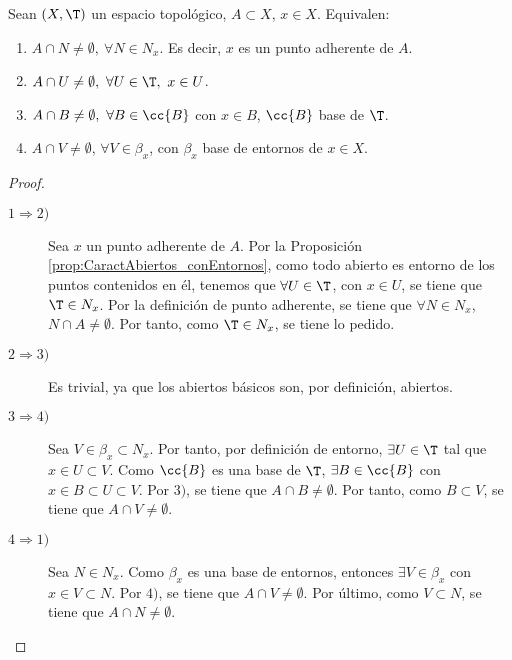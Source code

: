 \begin{prop}\label{prop:Caract_PtoAdherente}
    Sean $(X,\T)$ un espacio topológico, $A\subset X$, $x\in X$. Equivalen:
    \begin{enumerate}
        \item $A\cap N\neq \emptyset,~\forall N\in N_x$. Es decir, $x$ es un punto adherente de $A$.
        \item $A\cap U\neq \emptyset,~\forall U\in \T,~x\in U$.
        \item $A\cap B\neq \emptyset,~\forall B\in \cc{B}$ con $x\in B$, $\cc{B}$ base de $\T$.
        \item $A\cap V\neq \emptyset$, $\forall V\in \beta_x$, con $\beta_x$ base de entornos de $x\in X$.
    \end{enumerate}
\end{prop}
\begin{proof}\
    \begin{description}
        \item[$1\Longrightarrow 2)$] Sea $x$ un punto adherente de $A$. Por la Proposición \ref{prop:CaractAbiertos_conEntornos}, como todo abierto es entorno de los puntos contenidos en él, tenemos que $\forall U\in \T$, con $x\in U$, se tiene que $\T\in N_x$. Por la definición de punto adherente, se tiene que $\forall N\in N_x$, $N\cap A\neq \emptyset$. Por tanto, como $\T\in N_x$, se tiene lo pedido.

        \item[$2\Longrightarrow 3)$] Es trivial, ya que los abiertos básicos son, por definición, abiertos.
        
        \item[$3\Longrightarrow 4)$] Sea $V\in \beta_x\subset N_x$. Por tanto, por definición de entorno, $\exists U\in \T$ tal que $x\in U\subset V$. Como $\cc{B}$ es una base de $\T$, $\exists B\in \cc{B}$ con $x\in B\subset U\subset V$. Por $3)$, se tiene que $A\cap B\neq \emptyset$. Por tanto, como $B\subset V$, se tiene que $A\cap V\neq \emptyset$.

        \item[$4\Longrightarrow 1)$] Sea $N\in N_x$. Como $\beta_x$ es una base de entornos, entonces $\exists V\in \beta_x$ con $x\in V\subset N$. Por $4)$, se tiene que $A\cap V\neq \emptyset$. Por último, como $V\subset N$, se tiene que $A\cap N\neq \emptyset$.
    \end{description}
\end{proof}

